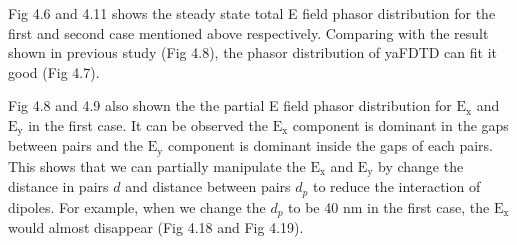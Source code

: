 Fig 4.6 and 4.11 shows the steady state total E field phasor distribution for the first and second case mentioned above
respectively. Comparing with the result shown in previous study (Fig 4.8), the phasor distribution of yaFDTD can fit it
good (Fig 4.7).

Fig 4.8 and 4.9 also shown the the partial E field phasor distribution for $\mathrm{E_x}$ and $\mathrm{E_y}$ in the
first case. It can be observed the $\mathrm{E_x}$ component is dominant in the gaps between pairs and the $\mathrm{E_y}$
component is dominant inside the gaps of each pairs. This shows that we can partially manipulate the $\mathrm{E_x}$ and
$\mathrm{E_y}$ by change the distance in pairs $d$ and distance between pairs $d_p$ to reduce the interaction of
dipoles.  For example, when we change the $d_p$ to be 40 nm in the first case, the $\mathrm{E_x}$ would almost
disappear (Fig 4.18 and Fig 4.19).
